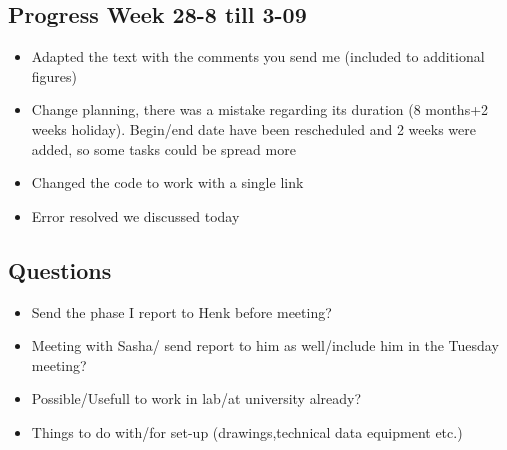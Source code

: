 \subsection*{Progress Week 28-8 till 3-09 }


\begin{itemize}
    \item Adapted the text with the comments you send me (included to additional figures)
    \item Change planning, there was a mistake regarding its duration (8 months+2 weeks holiday). Begin/end date have been rescheduled and 2 weeks were added, so some tasks could be spread more
    \item Changed the code to work with a single link
    \item Error resolved we discussed today
\end{itemize}

\subsection{Questions}

\begin{itemize}
    \item Send the phase I report to Henk before meeting?
    \item Meeting with Sasha/ send report to him as well/include him in the Tuesday meeting?
    \item Possible/Usefull to work in lab/at university already?
    \item Things to do with/for set-up (drawings,technical data equipment etc.)
\end{itemize}

